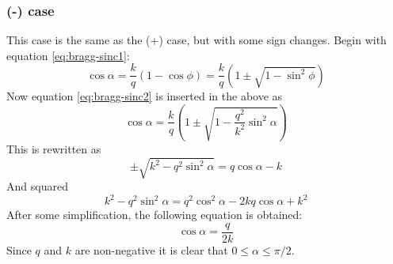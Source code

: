 \documentclass[10pt,a4paper]{eitExjobb}
\begin{document}
	\subsubsection{(-) case}
	This case is the same as the (+) case, but with some sign changes. Begin with equation \ref{eq:bragg-sinc1}:
	\begin{equation*}
	\cos{\alpha} = \frac{k}{q}\left( 1 - \cos{\phi} \right) = \frac{k}{q}\left( 1 \pm \sqrt{1-\sin^2{\phi}} \right)
	\end{equation*}
	Now equation \ref{eq:bragg-sinc2} is inserted in the above as
	\begin{equation*}
	\cos{\alpha} = \frac{k}{q}\left( 1 \pm \sqrt{1-\frac{q^2}{k^2}\sin^2{\alpha}} \right)
	\end{equation*}
	This is rewritten as
	\begin{equation*}
	\pm \sqrt{k^2-q^2\sin^2{\alpha}} = q\cos{\alpha} - k
	\end{equation*}
	And squared
	\begin{equation*}
	k^2 - q^2\sin^2{\alpha} = q^2\cos^2{\alpha} - 2kq\cos{\alpha} + k^2
	\end{equation*}
	After some simplification, the following equation is obtained:
	\begin{equation}
	\cos{\alpha} = \frac{q}{2k} \label{eq:bragg-cos-}
	\end{equation}
	Since $q$ and $k$ are non-negative it is clear that $0 \leq \alpha \leq \pi/2$.
\end{document}
